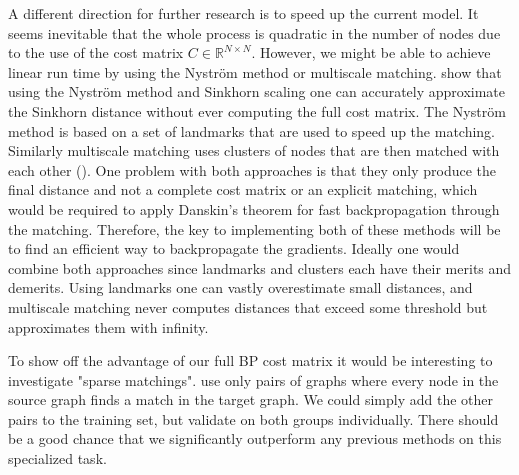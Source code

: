 A different direction for further research is to speed up the current model. It seems inevitable that the whole process is quadratic in the number of nodes due to the use of the cost matrix $C \in \mathbb{R}^{N \times N}$. However, we might be able to achieve linear run time by using the Nystr{\"{o}}m method or multiscale matching. \cite{nytrom2019} show that using the Nystr{\"{o}}m method and Sinkhorn scaling one can accurately approximate the Sinkhorn distance without ever computing the full cost matrix. The Nystr{\"{o}}m method is based on a set of landmarks that are used to speed up the matching. Similarly multiscale matching uses clusters of nodes that are then matched with each other (\citealp{multiscale2016}). One problem with both approaches is that they only produce the final distance and not a complete cost matrix or an explicit matching, which would be required to apply Danskin's theorem for fast backpropagation through the matching. Therefore, the key to implementing both of these methods will be to find an efficient way to backpropagate the gradients. Ideally one would combine both approaches since landmarks and clusters each have their merits and demerits. Using landmarks one can vastly overestimate small distances, and multiscale matching never computes distances that exceed some threshold but approximates them with infinity.

To show off the advantage of our full BP cost matrix it would be interesting to investigate "sparse matchings". \cite{fey2020_update} use only pairs of graphs where every node in the source graph finds a match in the target graph. We could simply add the other pairs to the training set, but validate on both groups individually. There should be a good chance that we significantly outperform any previous methods on this specialized task.
